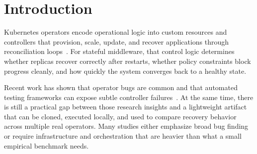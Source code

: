 \documentclass[sigconf,screen]{acmart}
\begin{document}
\begin{abstract}
Kubernetes operators automate deployment, scaling, and recovery for complex
stateful applications, but lightweight comparative benchmarks for recovery
behavior are still uncommon. This paper presents \emph{ReconcileUnderPolicy}, a
standalone benchmark artifact for policy-constrained recovery across
\RUPOperatorCount{} stateful operators, \RUPEnvironmentCount{} execution
environments, and four recovery scenarios. The current study evaluates the
RabbitMQ Cluster Operator and CloudNativePG on both single-node and multi-node
\texttt{kind} clusters, running \RUPTrialCount{} repeated trials per study for
\RUPScenarioExecutions{} scenario executions in total. All
\RUPSuccessfulScenarioExecutions{} scenario executions converged successfully.
Median completion times reveal substantial operator-specific differences:
RabbitMQ baseline creation required 174.93\,s and 189.58\,s on single-node and
multi-node clusters, while CloudNativePG required 38.04\,s and 35.93\,s.
Delete-and-recreate recovery showed a similar gap, with RabbitMQ at 59.50\,s
and 72.81\,s versus CloudNativePG at 32.17\,s and 33.58\,s. The benchmark also
exposes warmup-sensitive variance: CloudNativePG baseline means were
substantially higher than medians because the first trial in each environment
was much slower than subsequent runs. The result is a reproducible,
artifact-backed comparative benchmark that captures both successful recovery
coverage and scenario-level timing behavior across operators and environments.
\end{abstract}
\fi

\section{Introduction}

Kubernetes operators encode operational logic into custom resources and
controllers that provision, scale, update, and recover applications through
reconciliation loops~\cite{k8s-operator}. For stateful middleware, that control
logic determines whether replicas recover correctly after restarts, whether
policy constraints block progress cleanly, and how quickly the system converges
back to a healthy state.

Recent work has shown that operator bugs are common and that automated testing
frameworks can expose subtle controller failures~\cite{acto,sieve,watchers,issta-bugs}.
At the same time, there is still a practical gap between those research
insights and a lightweight artifact that can be cloned, executed locally, and
used to compare recovery behavior across multiple real operators. Many studies
either emphasize broad bug finding or require infrastructure and orchestration
that are heavier than what a small empirical benchmark needs.
\end{document}

